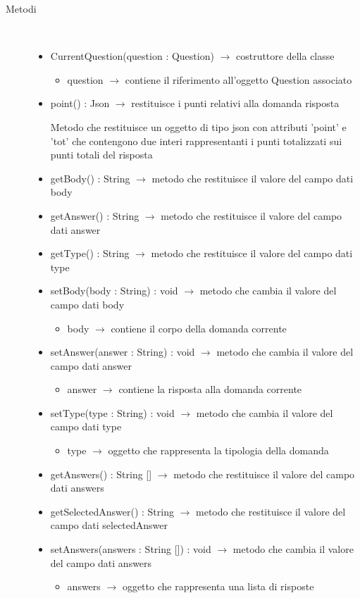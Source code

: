 \begin{description}
\item[Metodi] \hfill \\
\vspace{-7mm}
\begin{itemize}
	\item CurrentQuestion(question : Question) $\rightarrow$ costruttore della classe\begin{itemize}
		\item question $\rightarrow$ contiene il riferimento all'oggetto Question associato
	\end{itemize}
	
	\item point() : Json $\rightarrow$ restituisce i punti relativi alla domanda risposta
	
	Metodo che restituisce un oggetto di tipo json con attributi 'point' e 'tot' che contengono due interi rappresentanti i punti totalizzati sui punti totali del risposta
	\item getBody() : String $\rightarrow$ metodo che restituisce il valore del campo dati body
	\item getAnswer() : String $\rightarrow$ metodo che restituisce il valore del campo dati answer
	\item getType() : String $\rightarrow$ metodo che restituisce il valore del campo dati type
	\item setBody(body : String) : void $\rightarrow$ metodo che cambia il valore del campo dati body\begin{itemize}
		\item body $\rightarrow$ contiene il corpo della domanda corrente 
	\end{itemize}
	
	\item setAnswer(answer : String) : void $\rightarrow$ metodo che cambia il valore del campo dati answer\begin{itemize}
		\item answer $\rightarrow$ contiene la risposta alla domanda corrente
	\end{itemize}
	
	\item setType(type : String) : void $\rightarrow$ metodo che cambia il valore del campo dati type\begin{itemize}
		\item type $\rightarrow$ oggetto che rappresenta la tipologia della domanda
	\end{itemize}
	
	\item getAnswers() : String [] $\rightarrow$ metodo che restituisce il valore del campo dati answers
	\item getSelectedAnswer() : String $\rightarrow$ metodo che restituisce il valore del campo dati selectedAnswer
	\item setAnswers(answers : String []) : void $\rightarrow$ metodo che cambia il valore del campo dati answers\begin{itemize}
		\item answers $\rightarrow$ oggetto che rappresenta una lista di risposte
	\end{itemize}
	

\end{itemize}
\end{description}
